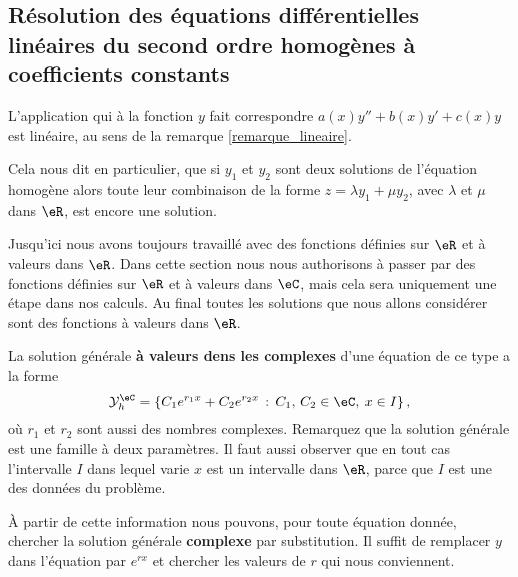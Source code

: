 \subsection{Résolution des équations différentielles linéaires du second ordre homogènes à coefficients constants}
\begin{remark}
 L'application qui à la fonction $y$ fait correspondre $a(x)y'' + b(x) y' + c(x)y$ est linéaire, au sens de la remarque \ref{remarque_lineaire}. 

Cela nous dit en particulier, que si $y_1$ et $y_2$ sont deux solutions de l'équation homogène alors toute leur combinaison de la forme $z = \lambda y_1 + \mu y_2$, avec $\lambda$ et $\mu$ dans $\eR$, est encore une solution.
 \end{remark}

\begin{framed}
  Jusqu'ici nous avons toujours travaillé avec des fonctions définies sur $\eR$ et à valeurs dans $\eR$. Dans cette section nous nous authorisons à passer par des fonctions définies sur $\eR$ et à valeurs dans $\eC$, mais cela sera uniquement une étape dans nos calculs. Au final toutes les solutions que nous allons considérer sont des fonctions à valeurs dans $\eR$.  
\end{framed}

La solution générale \textbf{à valeurs dens les complexes} d'une équation de ce type a la forme 
\begin{equation}\label{sol_gen_ordre_deux_hom}
  \mathcal{Y}_h^\eC  = \left\{C_1 e^{r_1x} +C_2 e^{r_2x} \,:\, C_1,\, C_2 \in \eC, \: x\in I \right\},
\end{equation}
où $r_1$ et $r_2$ sont aussi des nombres complexes. Remarquez que la solution générale est une famille à deux paramètres. Il faut aussi observer que en tout cas l'intervalle $I$ dans lequel varie $x$ est un intervalle dans $\eR$, parce que $I$ est une des données du problème.  

À partir de cette information nous pouvons, pour toute équation donnée, chercher la solution générale \textbf{complexe} par substitution. Il suffit de remplacer $y$ dans l'équation par $e^{rx}$ et chercher les valeurs de $r$ qui nous conviennent. 

